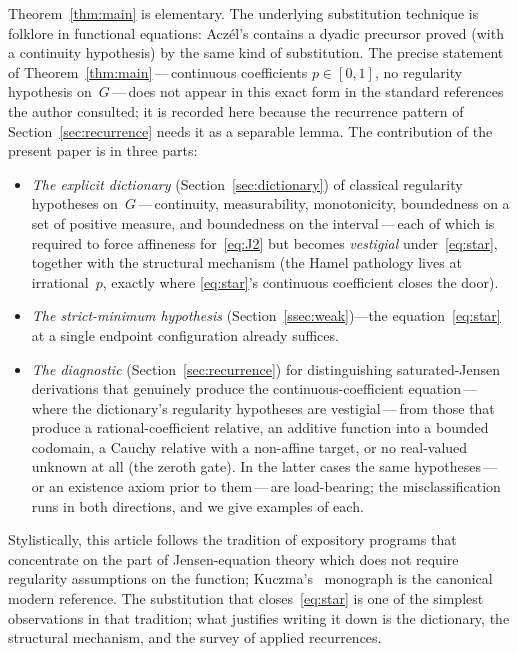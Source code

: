 \documentclass{article}
\theoremstyle{plain}
\theoremstyle{definition}
\begin{document}
Theorem~\ref{thm:main} is elementary. The underlying substitution
technique is folklore in functional equations: Acz\'el's
\cite[\S2.1.4]{Aczel1966} contains a dyadic precursor proved (with a
continuity hypothesis) by the same kind of substitution. The precise
statement of Theorem~\ref{thm:main}\,---\,continuous coefficients
$p\in[0,1]$, no regularity hypothesis on~$G$\,---\,does not appear in
this exact form in the standard references the author consulted; it is
recorded here because the recurrence pattern of
Section~\ref{sec:recurrence} needs it as a separable lemma. The
contribution of the present paper is in three parts:
\begin{itemize}
\item \emph{The explicit dictionary} (Section~\ref{sec:dictionary}) of
  classical regularity hypotheses on~$G$\,---\,continuity, measurability,
  monotonicity, boundedness on a set of positive measure, and
  boundedness on the interval\,---\,each of which is required to force
  affineness for~\eqref{eq:J2} but becomes \emph{vestigial}
  under~\eqref{eq:star}, together with the structural mechanism (the
  Hamel pathology lives at irrational~$p$, exactly where
  \eqref{eq:star}'s continuous coefficient closes the door).

\item \emph{The strict-minimum hypothesis}
  (Section~\ref{ssec:weak})---the
  equation~\eqref{eq:star} at a single endpoint configuration already
  suffices.

\item \emph{The diagnostic} (Section~\ref{sec:recurrence}) for
  distinguishing saturated-Jensen derivations that genuinely produce
  the continuous-coefficient equation\,---\,where the dictionary's
  regularity hypotheses are vestigial\,---\,from those that produce a
  rational-coefficient relative, an additive function into a bounded
  codomain, a Cauchy relative with a non-affine target, or no
  real-valued unknown at all (the zeroth gate). In the
  latter cases the same hypotheses\,---\,or an existence axiom prior
  to them\,---\,are load-bearing; the
  misclassification runs in both directions, and we give examples of
  each.
\end{itemize}

Stylistically, this article follows the tradition of expository programs
that concentrate on the part of Jensen-equation theory which does not
require regularity assumptions on the function;
Kuczma's~\cite{Kuczma2009} monograph is the canonical modern reference.
The substitution that closes~\eqref{eq:star} is one of the simplest
observations in that tradition; what justifies writing it down is the
dictionary, the structural mechanism, and the survey of applied
recurrences.
\end{document}
